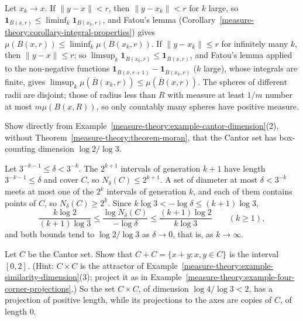 \begin{solution}
Let $x_k \to x$. If $\|y - x\| < r$, then $\|y - x_k\| < r$ for $k$ large, so $\mathbf{1}_{B(x, r)} \leq \liminf_k\mathbf{1}_{B(x_k, r)}$, and Fatou's lemma
(Corollary~\ref{measure-theory:corollary-integral-properties}) gives $\mu(B(x, r)) \leq \liminf_k\mu(B(x_k, r))$. If $\|y - x_k\| \leq r$ for infinitely many $k$, then $\|y - x\| \leq r$; so
$\limsup_k\mathbf{1}_{\overline{B}(x_k, r)} \leq \mathbf{1}_{\overline{B}(x, r)}$, and Fatou's lemma applied to the non-negative functions $\mathbf{1}_{\overline{B}(x, r + 1)} - \mathbf{1}_{\overline{B}(x_k, r)}$
($k$ large), whose integrals are finite, gives $\limsup_k\mu(\overline{B}(x_k, r)) \leq \mu(\overline{B}(x, r))$. The spheres of different radii are disjoint; those of radius less than $R$ with measure at
least $1/m$ number at most $m\mu(B(x, R))$, so only countably many spheres have positive measure.
\end{solution}

\begin{exercise}\label{measure-theory:exercise-box-cantor}
Show directly from Example~\ref{measure-theory:example-cantor-dimension}(2), without Theorem~\ref{measure-theory:theorem-moran}, that the Cantor set has box-counting dimension $\log 2/\log 3$.
\end{exercise}

\begin{solution}
Let $3^{-k-1} \leq \delta < 3^{-k}$. The $2^{k+1}$ intervals of generation $k + 1$ have length $3^{-k-1} \leq \delta$ and cover $C$, so $N_\delta(C) \leq 2^{k+1}$. A set of diameter at most $\delta < 3^{-k}$
meets at most one of the $2^k$ intervals of generation $k$, and each of them contains points of $C$, so $N_\delta(C) \geq 2^k$. Since $k\log 3 < -\log\delta \leq (k + 1)\log 3$,
\[
\frac{k\log 2}{(k + 1)\log 3} \leq \frac{\log N_\delta(C)}{-\log\delta} \leq \frac{(k + 1)\log 2}{k\log 3} \qquad (k \geq 1),
\]
and both bounds tend to $\log 2/\log 3$ as $\delta \to 0$, that is, as $k \to \infty$.
\end{solution}

\begin{exercise}\label{measure-theory:exercise-cantor-sum}
Let $C$ be the Cantor set. Show that $C + C = \{x + y : x, y \in C\}$ is the interval $[0, 2]$. (Hint: $C \times C$ is the attractor of
Example~\ref{measure-theory:example-similarity-dimension}(3); project it as in Example~\ref{measure-theory:example-four-corner-projections}.) So the set $C \times C$, of dimension $\log 4/\log 3 < 2$, has a
projection of positive length, while its projections to the axes are copies of $C$, of length $0$.
\end{exercise}

